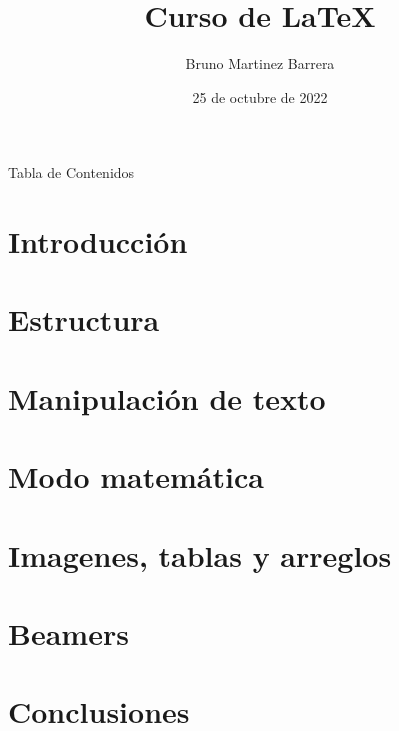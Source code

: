 \documentclass[10pt]{beamer}
\title{Curso de \LaTeX{}}
\author{Bruno Martinez Barrera}
\date{25 de octubre de 2022}
\institute{Universidad Técnica Federico Santa María}
\begin{document}
    \begin{frame}
        \maketitle
    \end{frame}
    
    \begin{frame}{Tabla de Contenidos}
        \tableofcontents[hideallsubsections]
    \end{frame}
	
\section{Introducción}

    

\section{Estructura}

    
    
\section{Manipulación de texto}

    

\section{Modo matemática}

    
    
\section{Imagenes, tablas y arreglos}

    
    
\section{Beamers}

    
    
\section{Conclusiones}

    
\end{document}

